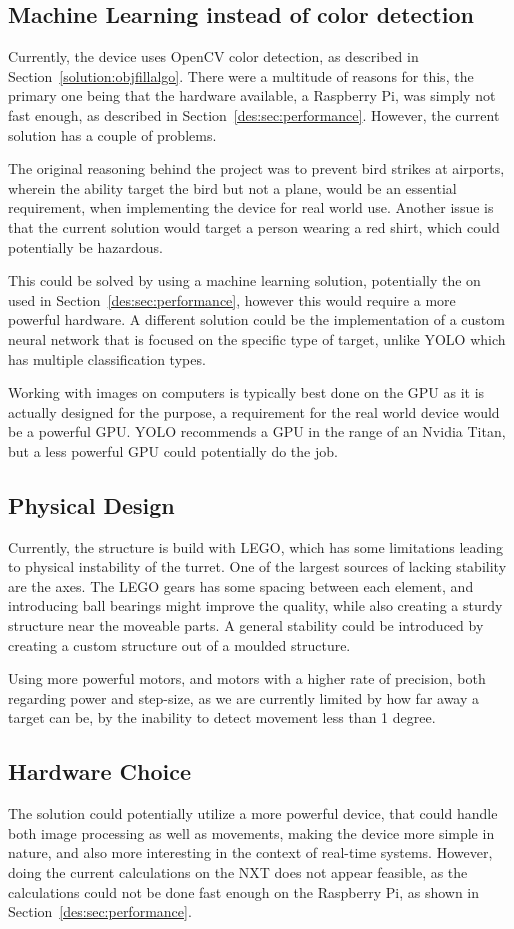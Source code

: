 \subsection{Machine Learning instead of color detection}

Currently, the device uses OpenCV color detection, as described in Section~\ref{solution:objfillalgo}.
There were a multitude of reasons for this, the primary one being that the hardware available, a Raspberry Pi, was simply not fast enough, as described in Section~\ref{des:sec:performance}.
However, the current solution has a couple of problems.

The original reasoning behind the project was to prevent bird strikes at airports, wherein the ability target the bird but not a plane, would be an essential requirement, when implementing the device for real world use.
Another issue is that the current solution would target a person wearing a red shirt, which could potentially be hazardous.

This could be solved by using a machine learning solution, potentially the on used in Section~\ref{des:sec:performance}, however this would require a more powerful hardware.
A different solution could be the implementation of a custom neural network that is focused on the specific type of target, unlike YOLO which has multiple classification types.

Working with images on computers is typically best done on the GPU as it is actually designed for the purpose, a requirement for the real world device would be a powerful GPU.
YOLO recommends a GPU in the range of an Nvidia Titan, but a less powerful GPU could potentially do the job.

\subsection{Physical Design}
Currently, the structure is build with LEGO, which has some limitations leading to physical instability of the turret.
One of the largest sources of lacking stability are the axes.
The LEGO gears has some spacing between each element, and introducing ball bearings might improve the quality, while also creating a sturdy structure near the moveable parts.
A general stability could be introduced by creating a custom structure out of a moulded structure.

Using more powerful motors, and motors with a higher rate of precision, both regarding power and step-size, as we are currently limited by how far away a target can be, by the inability to detect movement less than 1 degree.


\subsection{Hardware Choice}
The solution could potentially utilize a more powerful device, that could handle both image processing as well as movements, making the device more simple in nature, and also more interesting in the context of real-time systems.
However, doing the current calculations on the NXT does not appear feasible, as the calculations could not be done fast enough on the Raspberry Pi, as shown in Section~\ref{des:sec:performance}.
 
